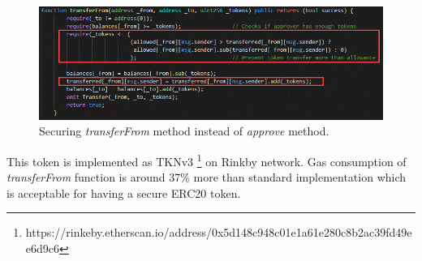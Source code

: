 \begin{figure}[H]
	\centering
	\includegraphics[width=1.0\linewidth]{figures/multiple_withdrawal_31.png}
	\caption{Securing \textit{transferFrom} method instead of \textit{approve} method.}
\end{figure}
\noindent This token is implemented as TKNv3 \footnote{https://rinkeby.etherscan.io/address/0x5d148c948c01e1a61e280c8b2ac39fd49ee6d9c6} on Rinkby network. Gas consumption of \textit{transferFrom} function is around 37\% more than standard implementation which is acceptable for having a secure ERC20 token.